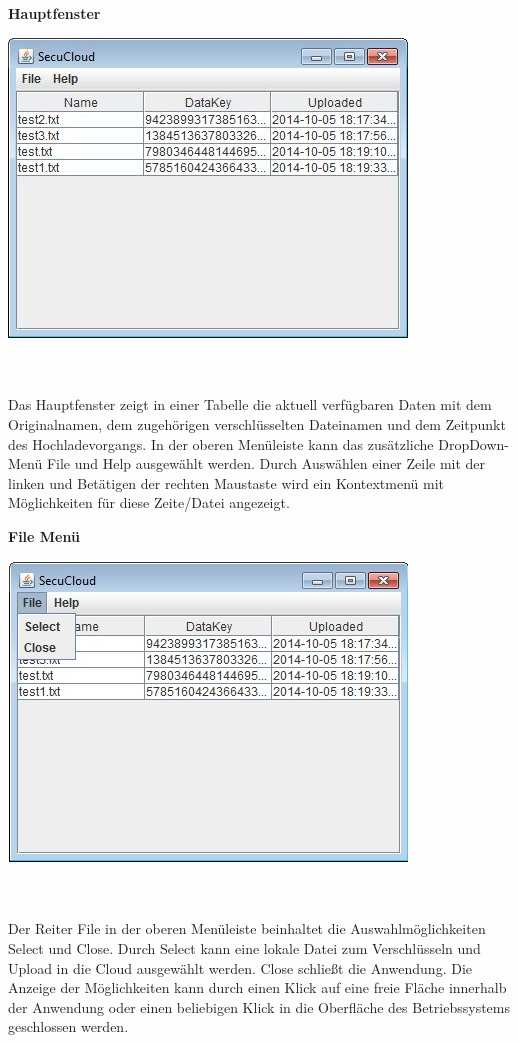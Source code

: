 \documentclass[12pt,a4paper,bibliography=totocnumbered,listof=totocnumbered]{scrartcl}
\begin{document}
\textbf{Hauptfenster}
\vspace{1em}
$\;$\\
\begin{minipage}{\linewidth}
	\centering
	\includegraphics[width=0.4\linewidth]{Main.jpg}
	\label{Main}
\end{minipage}
\\\\Das Hauptfenster zeigt in einer Tabelle die aktuell verfügbaren Daten mit dem Originalnamen, dem zugehörigen verschlüsselten Dateinamen und dem Zeitpunkt des Hochladevorgangs. In der oberen Menüleiste kann das zusätzliche DropDown-Menü File und Help ausgewählt werden. Durch Auswählen einer Zeile mit der linken und Betätigen der rechten Maustaste wird ein Kontextmenü mit Möglichkeiten für diese Zeite/Datei angezeigt.

\textbf{File Menü}
\vspace{1em}
$\;$\\
\begin{minipage}{\linewidth}
	\centering
	\includegraphics[width=0.4\linewidth]{File.jpg}
	\label{File}
\end{minipage}
\\\\Der Reiter File in der oberen Menüleiste beinhaltet die Auswahlmöglichkeiten Select und Close. Durch Select kann eine lokale Datei zum Verschlüsseln und Upload in die Cloud ausgewählt werden. Close schließt die Anwendung. Die Anzeige der Möglichkeiten kann durch einen Klick auf eine freie Fläche innerhalb der Anwendung oder einen beliebigen Klick in die Oberfläche des Betriebssystems geschlossen werden.
\end{document}
